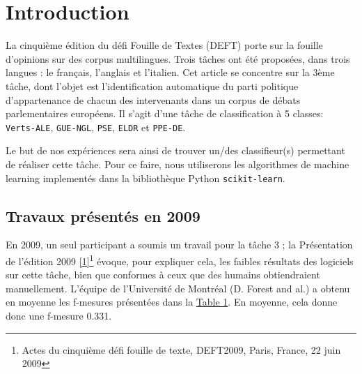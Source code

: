 \section{Introduction}

\par La cinquième édition du défi Fouille de Textes (DEFT) porte sur la fouille d'opinions sur des corpus multilingues. Trois tâches ont été proposées,
dans trois langues : le français, l'anglais et l'italien. Cet article se concentre sur la 3ème tâche, dont l'objet est l'identification automatique
du parti politique d'appartenance de chacun des intervenants dans un corpus de débats parlementaires européens. Il s'agit d'une tâche de classification à 5 classes:
\texttt{Verts-ALE}, \texttt{GUE-NGL}, \texttt{PSE}, \texttt{ELDR} et \texttt{PPE-DE}.

\par Le but de nos expériences sera ainsi de trouver un/des classifieur(s) permettant de réaliser cette tâche. Pour ce faire, nous utiliserons les algorithmes
de machine learning implementés dans la bibliothèque Python \texttt{scikit-learn}.

\subsection{Travaux présentés en 2009}




\begin{table}[h!]
\centering
\setlength{\tabcolsep}{5pt} %
\renewcommand{\arraystretch}{1.2} %
\caption{Moyennes des F-mesures par parti politique.}
\label{tab:moyennes_fmesures}
\end{table}


\par En 2009, un seul participant a soumis un travail pour la tâche 3 ; la Présentation de l'édition 2009 \hyperlink{ref1}{[1]}\footnote{Actes du cinquième défi fouille de texte, DEFT2009, Paris, France, 22 juin 2009} évoque, pour expliquer cela, les faibles résultats des logiciels sur cette tâche, bien que conformes à ceux que des humains obtiendraient manuellement. L'équipe de l'Université de Montréal (D. Forest and al.) a obtenu en moyenne les f-mesures présentées dans la \hyperref[tab:moyennes_fmesures]{Table 1}. En moyenne, cela donne donc une f-mesure 0.331.

